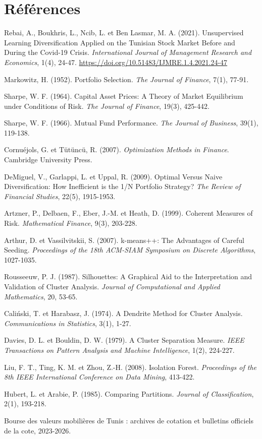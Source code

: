 \documentclass[11pt,a4paper]{article}
\begin{document}
\section*{Références}
\begin{enumerate}[label={[\arabic*]},leftmargin=*]
  \item Rebai, A., Boukhris, L., Ncib, L. et Ben Lasmar, M. A. (2021). Unsupervised Learning Diversification Applied on the Tunisian Stock Market Before and During the Covid-19 Crisis. \emph{International Journal of Management Research and Economics}, 1(4), 24-47. \url{https://doi.org/10.51483/IJMRE.1.4.2021.24-47}
  \item Markowitz, H. (1952). Portfolio Selection. \emph{The Journal of Finance}, 7(1), 77-91.
  \item Sharpe, W. F. (1964). Capital Asset Prices: A Theory of Market Equilibrium under Conditions of Risk. \emph{The Journal of Finance}, 19(3), 425-442.
  \item Sharpe, W. F. (1966). Mutual Fund Performance. \emph{The Journal of Business}, 39(1), 119-138.
  \item Cornuéjols, G. et Tütüncü, R. (2007). \emph{Optimization Methods in Finance}. Cambridge University Press.
  \item DeMiguel, V., Garlappi, L. et Uppal, R. (2009). Optimal Versus Naive Diversification: How Inefficient is the 1/N Portfolio Strategy? \emph{The Review of Financial Studies}, 22(5), 1915-1953.
  \item Artzner, P., Delbaen, F., Eber, J.-M. et Heath, D. (1999). Coherent Measures of Risk. \emph{Mathematical Finance}, 9(3), 203-228.
  \item Arthur, D. et Vassilvitskii, S. (2007). k-means++: The Advantages of Careful Seeding. \emph{Proceedings of the 18th ACM-SIAM Symposium on Discrete Algorithms}, 1027-1035.
  \item Rousseeuw, P. J. (1987). Silhouettes: A Graphical Aid to the Interpretation and Validation of Cluster Analysis. \emph{Journal of Computational and Applied Mathematics}, 20, 53-65.
  \item Caliński, T. et Harabasz, J. (1974). A Dendrite Method for Cluster Analysis. \emph{Communications in Statistics}, 3(1), 1-27.
  \item Davies, D. L. et Bouldin, D. W. (1979). A Cluster Separation Measure. \emph{IEEE Transactions on Pattern Analysis and Machine Intelligence}, 1(2), 224-227.
  \item Liu, F. T., Ting, K. M. et Zhou, Z.-H. (2008). Isolation Forest. \emph{Proceedings of the 8th IEEE International Conference on Data Mining}, 413-422.
  \item Hubert, L. et Arabie, P. (1985). Comparing Partitions. \emph{Journal of Classification}, 2(1), 193-218.
  \item Bourse des valeurs mobilières de Tunis : archives de cotation et bulletins officiels de la cote, 2023-2026.
\end{enumerate}
\end{document}
